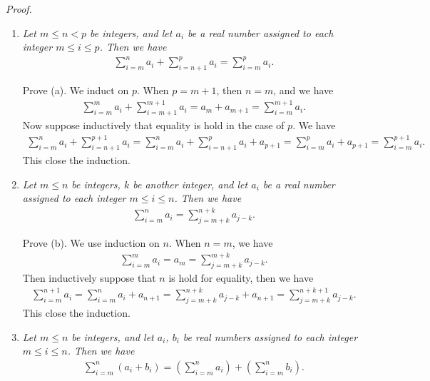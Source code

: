 \documentclass{book}
\newcommand{\pff}{\vspace{.25em}\noindent\emph{Proof.}~~}
\begin{document}
\pff
\begin{enumerate}
    \item \emph{Let $m\leq n<p$ be integers, and let $a_i$ be a real number assigned to each integer $m\leq i\leq p$. Then we have}
    \begin{align*}
        \sum_{i=m}^na_i+\sum_{i=n+1}^pa_i=\sum_{i=m}^pa_i.
    \end{align*}

    Prove (a). We induct on $p$. When $p=m+1$, then $n=m$, and we have
    \begin{align*}
        \sum_{i=m}^ma_i+\sum_{i=m+1}^{m+1}a_i=a_m+a_{m+1}=\sum_{i=m}^{m+1}a_i.
    \end{align*}
    Now suppose inductively that equality is hold in the case of $p$. We have
    \begin{align*}
        \sum_{i=m}^na_i+\sum_{i=n+1}^{p+1}a_i=\sum_{i=m}^na_i+\sum_{i=n+1}^pa_i+a_{p+1}=\sum_{i=m}^{p}a_i+a_{p+1}=\sum_{i=m}^{p+1}a_i.
    \end{align*}
    This close the induction.

    \item \emph{Let $m\leq n$ be integers, $k$ be another integer, and let $a_i$ be a real number assigned to each integer $m\leq i\leq n$. Then we have}
    \begin{align*}
        \sum_{i=m}^na_i=\sum_{j=m+k}^{n+k}a_{j-k}.
    \end{align*}

    Prove (b). We use induction on $n$. When $n=m$, we have
    \begin{align*}
        \sum_{i=m}^ma_i=a_m=\sum_{j=m+k}^{m+k}a_{j-k}.
    \end{align*}
    Then inductively suppose that $n$ is hold for equality, then we have
    \begin{align*}
        \sum_{i=m}^{n+1}a_i=\sum_{i=m}^na_i+a_{n+1}=\sum_{j=m+k}^{n+k}a_{j-k}+a_{n+1}=\sum_{j=m+k}^{n+k+1}a_{j-k}.
    \end{align*}
    This close the induction.

    \item \emph{Let $m\leq n$ be integers, and let $a_i$, $b_i$ be real numbers assigned to each integer $m\leq i\leq n$. Then we have}
    \begin{align*}
        \sum_{i=m}^n(a_i+b_i)=\left(\sum_{i=m}^na_i\right)+\left(\sum_{i=m}^nb_i\right).
    \end{align*}


\end{enumerate}
\end{document}
